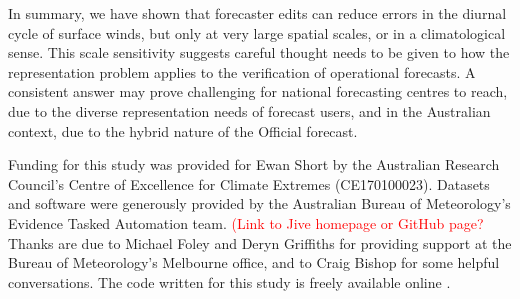 \documentclass[twocol]{ametsoc}
\begin{document}
In summary, we have shown that forecaster edits can reduce errors in the diurnal cycle of surface winds, but only at very large spatial scales, or in a climatological sense. This scale sensitivity suggests careful thought needs to be given to how the representation problem applies to the verification of operational forecasts. A consistent answer may prove challenging for national forecasting centres to reach, due to the diverse representation needs of forecast users, and in the Australian context, due to the hybrid nature of the Official forecast.

\acknowledgments
Funding for this study was provided for Ewan Short by the Australian Research Council's Centre of Excellence for Climate Extremes (CE170100023). Datasets and software were generously provided by the Australian Bureau of Meteorology's Evidence Tasked Automation team. \textcolor{red}{(Link to Jive homepage or GitHub page?} Thanks are due to Michael Foley and Deryn Griffiths for providing support at the Bureau of Meteorology's Melbourne office, and to Craig Bishop for some helpful conversations. The code written for this study is freely available online \citep{shortGitVeri19}.



\end{document}
